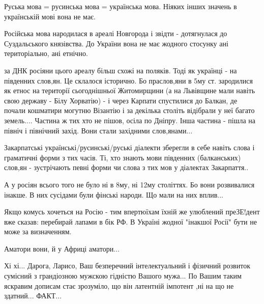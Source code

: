 \begin{itemize}
Руська мова = русинська мова = українська мова. Ніяких інших значень в
українській мові вона не має.

Російська мова народилася в ареалі Новгорода і звідти - дотягнулася до
Суздальського князівства. До України вона не має жодного стосунку ані
територіально, ані етнічно.

за ДНК росіяни цього ареалу більш схожі на поляків. Тоді як українці - на
південних слов,ян. Це склалося історично. Бо праслов,яни в 5му ст. зародилися
як етнос на території сьогоднішньої Житомирщини (а на Львівщине мали навіть
свою державу - Білу Хорватію) - і через Карпати спустилися до Балкан, де почали
кошматири могутню Візантію і за декілька століть відібрали у неї багато
земель.... Частина ж тих хто не пішов, осіла по Дніпру. Інша частина - пішла на
північ і північний захід. Вони стали західними слов,янами...

Закарпатські українські/русинські/руські діалекти зберегли в себе навіть слова
і граматичні форми з тих часів. Ті, хто знають мови південних (балканських)
слов,ян - зустрічають певні форми чи слова з тих мов у діалектах Закарпаття..

А у росіян всього того не було ні в 8му, ні 12му століттях. Бо вони розвивалися
інакше. В них сусідами були фінські народи. Що мали на них вплив...

Якщо комусь хочеться на Росію - тим впертюїхам їхній же улюблений преЗЕ!дент
вже сказав: перебирай лапами в бік РФ. В Україні жодної "інакшої Росії" бути не
може за визначенням.

 
Аматори вони, й у Африці аматори...

 

Хі хі... Дарога, Ларисо, Ваш безперечний інтелектуальний і фізичний розвиток
сумісний з грандіозною мужскою гідністю Вашого мужа... По Вашим таким яскравим
дописам стає зрозуміло, що він латентній імпотент ,ні на що не
здатний... ФАКТ...🤣


 

\end{itemize}
